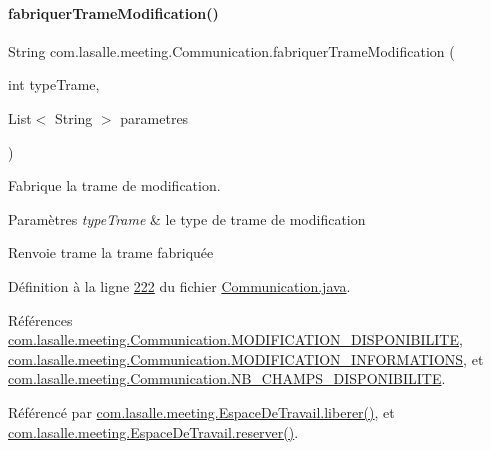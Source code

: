 \paragraph{\texorpdfstring{fabriquer\+Trame\+Modification()}{fabriquerTrameModification()}}
{\footnotesize\ttfamily String com.\+lasalle.\+meeting.\+Communication.\+fabriquer\+Trame\+Modification (\begin{DoxyParamCaption}\item[{int}]{type\+Trame,  }\item[{List$<$ String $>$}]{parametres }\end{DoxyParamCaption})}



Fabrique la trame de modification. 


\begin{DoxyParams}{Paramètres}
{\em type\+Trame} & le type de trame de modification \\
\hline
\end{DoxyParams}
\begin{DoxyReturn}{Renvoie}
trame la trame fabriquée 
\end{DoxyReturn}


Définition à la ligne \hyperlink{_communication_8java_source_l00222}{222} du fichier \hyperlink{_communication_8java_source}{Communication.\+java}.



Références \hyperlink{_communication_8java_source_l00058}{com.\+lasalle.\+meeting.\+Communication.\+M\+O\+D\+I\+F\+I\+C\+A\+T\+I\+O\+N\+\_\+\+D\+I\+S\+P\+O\+N\+I\+B\+I\+L\+I\+TE}, \hyperlink{_communication_8java_source_l00057}{com.\+lasalle.\+meeting.\+Communication.\+M\+O\+D\+I\+F\+I\+C\+A\+T\+I\+O\+N\+\_\+\+I\+N\+F\+O\+R\+M\+A\+T\+I\+O\+NS}, et \hyperlink{_communication_8java_source_l00060}{com.\+lasalle.\+meeting.\+Communication.\+N\+B\+\_\+\+C\+H\+A\+M\+P\+S\+\_\+\+D\+I\+S\+P\+O\+N\+I\+B\+I\+L\+I\+TE}.



Référencé par \hyperlink{_espace_de_travail_8java_source_l00145}{com.\+lasalle.\+meeting.\+Espace\+De\+Travail.\+liberer()}, et \hyperlink{_espace_de_travail_8java_source_l00130}{com.\+lasalle.\+meeting.\+Espace\+De\+Travail.\+reserver()}.


